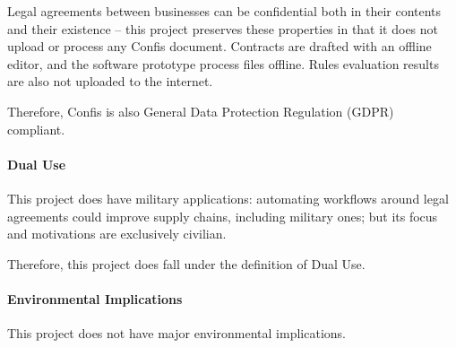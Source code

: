 Legal agreements between businesses can be confidential both in their contents and their existence -- this project preserves these properties in that it does not upload or process any Confis document.
Contracts are drafted with an offline editor, and the software prototype process files offline.
Rules evaluation results are also not uploaded to the internet.

Therefore, Confis is also General Data Protection Regulation (GDPR)~\cite{gdprInfo} compliant.

\paragraph{Dual Use}\label{par:dual-use}

This project does have military applications: automating workflows around legal agreements could improve supply chains, including military ones;
but its focus and motivations are exclusively civilian.

Therefore, this project does fall under the definition of Dual Use.

\paragraph{Environmental Implications}\label{par:environmental-implications}

This project does not have major environmental implications.

